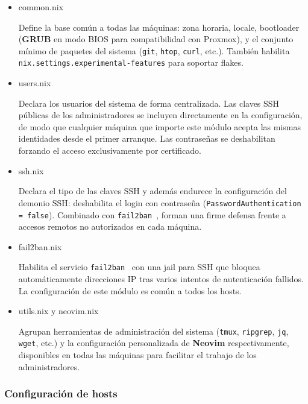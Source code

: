 \documentclass[a4paper, 11pt]{article}
\begin{document}
\begin{itemize}
  \item common.nix
    
    Define la base común a todas las máquinas: zona horaria, locale, bootloader (\textbf{GRUB} en modo BIOS para compatibilidad con Proxmox), 
    y el conjunto mínimo de paquetes del sistema (\texttt{git}, \texttt{htop}, \texttt{curl}, etc.). También habilita \texttt{nix.settings.experimental-features} para soportar flakes.

  \item users.nix

    Declara los usuarios del sistema de forma centralizada. 
    Las claves SSH públicas de los administradores se incluyen directamente en la configuración, 
    de modo que cualquier máquina que importe este módulo acepta las mismas identidades desde el primer arranque. 
    Las contraseñas se deshabilitan forzando el acceso exclusivamente por certificado.

  \item ssh.nix

    Declara el tipo de las claves SSH y además endurece la configuración del demonio SSH: deshabilita el login con contraseña (\texttt{PasswordAuthentication = false}). 
    Combinado con \texttt{fail2ban}~\cite{fail2ban}, forman una firme defensa frente a accesos remotos no autorizados en cada máquina.

  \item fail2ban.nix

    Habilita el servicio \texttt{fail2ban}~\cite{fail2ban} con una jail para SSH que bloquea automáticamente direcciones IP tras varios intentos de autenticación fallidos. 
    La configuración de este módulo es común a todos los hosts.

  \item utils.nix y neovim.nix

    Agrupan herramientas de administración del sistema (\texttt{tmux}, \texttt{ripgrep}, \texttt{jq}, \texttt{wget}, etc.) 
    y la configuración personalizada de \textbf{Neovim} respectivamente, 
    disponibles en todas las máquinas para facilitar el trabajo de los administradores.

\end{itemize}

\subsubsection{Configuración de hosts}
\end{document}
